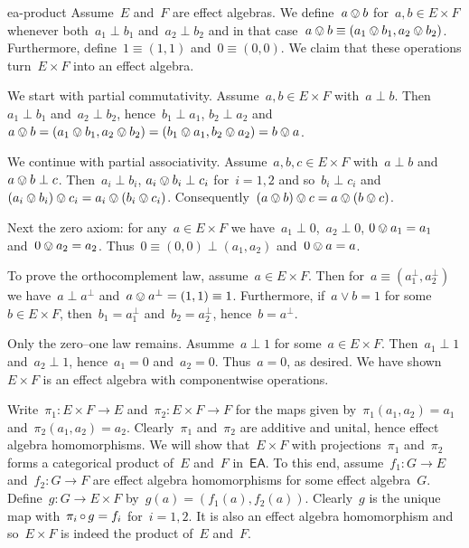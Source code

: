\begin{solution}{ea-product}%
Assume~$E$ and~$F$ are effect algebras.
We define~$a \ovee b$ for~$a,b \in E\times F$
    whenever both~$a_1 \perp b_1$ and~$a_2 \perp b_2$
    and in that case~$a\ovee b \equiv (a_1 \ovee b_1, a_2 \ovee b_2)$.
Furthermore, define~$1 \equiv (1,1)$ and~$0 \equiv (0,0)$.
We claim that these operations turn~$E \times F$ into an effect algebra.

We start with partial commutativity.
Assume~$a,b \in E\times F$ with~$a \perp b$.
Then~$a_1 \perp b_1$ and~$a_2 \perp b_2$,
    hence~$b_1 \perp a_1$, $b_2 \perp a_2$
    and~$a \ovee b = (a_1 \ovee b_1, a_2 \ovee b_2)
                    = (b_1 \ovee a_1, b_2 \ovee a_2)
                    = b \ovee a$.

We continue with partial associativity.
Assume~$a,b,c \in E\times F$ with~$a\perp b$ and~$a \ovee b \perp c$.
Then~$a_i \perp b_i$, $a_i \ovee b_i \perp c_i$ for~$i=1,2$
    and so~$b_i \perp c_i$ and~$(a_i \ovee b_i) \ovee c_i = a_i \ovee (
    b_i \ovee c_i)$. Consequently~$(a \ovee b) \ovee c = a \ovee (b\ovee c)$.

    Next the zero axiom: for any~$a \in E\times F$
        we have~$a_1 \perp 0$,~$a_2 \perp 0$, $0 \ovee a_1 =a_1$
        and~$0 \ovee a_2 = a_2$.
            Thus~$0 \equiv (0,0) \perp (a_1,a_2)$ and~$0 \ovee a = a$.

    To prove the orthocomplement law, assume~$a \in E \times F$.
        Then for~$a \equiv (a_1^\perp, a_2^\perp)$
            we have~$a \perp a^\perp$ and~$a \ovee a^\perp = (1,1) \equiv 1$.
    Furthermore, if~$a \vee b = 1$ for some~$b \in E \times F$,
        then~$b_1 = a_1^\perp$ and~$b_2 = a_2^\perp$, hence~$b = a^\perp$.

Only the zero--one law remains.  Asumme~$a\perp 1$ for some~$a \in E \times F$.
Then~$a_1 \perp 1$ and~$a_2 \perp 1$, hence~$a_1=0$ and~$a_2=0$.
Thus~$a = 0$, as desired.
We have shown~$E \times F$ is an effect algebra with componentwise operations.

Write~$\pi_1\colon E\times F \to E$ and~$\pi_2\colon E\times F \to F$
        for the maps given by~$\pi_1(a_1,a_2) = a_1$
            and~$\pi_2(a_1,a_2)=a_2$.
    Clearly~$\pi_1$ and~$\pi_2$ are additive and unital, hence
    effect algebra homomorphisms.
We will show that~$E\times F$ with projections~$\pi_1$ and~$\pi_2$
    forms a categorical product of~$E$ and~$F$ in~$\mathsf{EA}$.
To this end, assume~$f_1\colon G \to E$ and~$f_2\colon G \to F$
    are effect algebra homomorphisms for some effect algebra~$G$.
Define~$g\colon G \to E\times F$ by~$g(a) = (f_1(a), f_2(a))$.
Clearly~$g$ is the unique map with~$\pi_i \mathop{\circ} g = f_i$ for~$i=1,2$.
It is also an effect algebra homomorphism and
    so~$E \times F$ is indeed the product of~$E$ and~$F$.
\end{solution}
